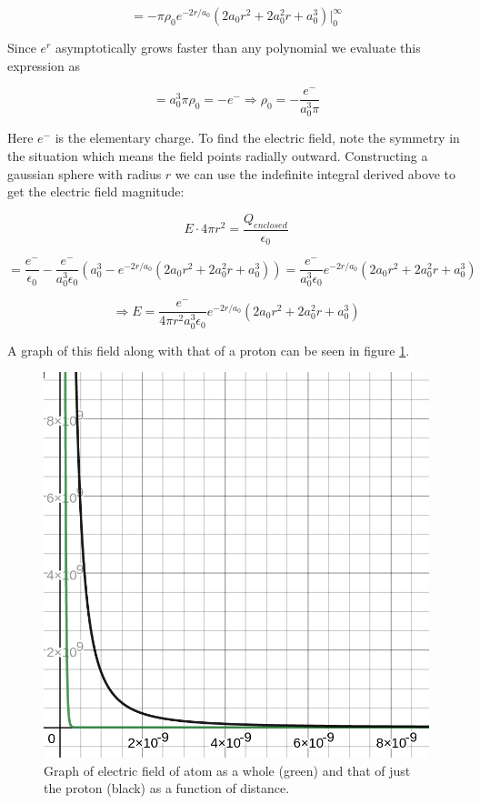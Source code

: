\documentclass[letterpaper, reqno,11pt]{article}
\begin{document}
$$
    =-\pi\rho_0e^{-2r/a_0}(2a_0r^2+2a_0^2r+a_0^3)\bigg|_0^{\infty}
$$

Since $e^r$ asymptotically grows faster than any polynomial we evaluate this expression as 

$$
    =a_0^3\pi\rho_0=-e^-\Rightarrow \rho_0=-\frac{e^-}{a_0^3\pi}
$$

Here $e^-$ is the elementary charge. To find the electric field, note the symmetry in the situation which means the field points radially outward. Constructing a gaussian sphere with radius $r$ we can use the indefinite integral derived above to get the electric field magnitude: 

$$
    E\cdot4\pi r^2=\frac{Q_{enclosed}}{\epsilon_0}
$$

$$
    =\frac{e^-}{\epsilon_0}-\frac{e^-}{a_0^3\epsilon_0}(a_0^3-e^{-2r/a_0}(2a_0r^2+2a_0^2r+a_0^3))=\frac{e^-}{a_0^3\epsilon_0}e^{-2r/a_0}(2a_0r^2+2a_0^2r+a_0^3)
$$

$$
    \Rightarrow E=\frac{e^-}{4\pi r^2 a_0^3\epsilon_0}e^{-2r/a_0}(2a_0r^2+2a_0^2r+a_0^3)
$$

A graph of this field along with that of a proton can be seen in figure \ref{fig:q4}. 

\begin{figure}[htbp]
\centering
\includegraphics[width=\textwidth]{q4}
\caption{Graph of electric field of atom as a whole (green) and that of just the proton (black) as a function of distance. }
\label{fig:q4}
\end{figure}
\end{document}
